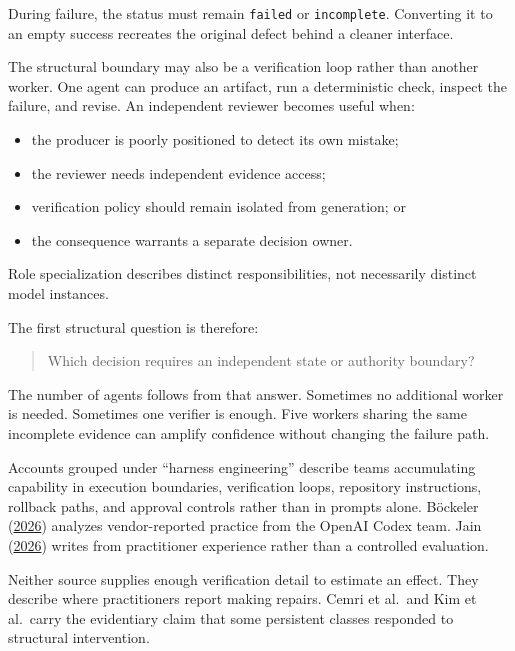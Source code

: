 During failure, the status must remain \texttt{failed} or \texttt{incomplete}. Converting it to an empty success recreates the original defect behind a cleaner interface.


The structural boundary may also be a verification loop rather than another worker. One agent can produce an artifact, run a deterministic check, inspect the failure, and revise. An independent reviewer becomes useful when:

\begin{itemize}
\tightlist
\item
  the producer is poorly positioned to detect its own mistake;
\item
  the reviewer needs independent evidence access;
\item
  verification policy should remain isolated from generation; or
\item
  the consequence warrants a separate decision owner.
\end{itemize}

Role specialization describes distinct responsibilities, not necessarily distinct model instances.

The first structural question is therefore:

\begin{quote}
Which decision requires an independent state or authority boundary?
\end{quote}

The number of agents follows from that answer. Sometimes no additional worker is needed. Sometimes one verifier is enough. Five workers sharing the same incomplete evidence can amplify confidence without changing the failure path.

Accounts grouped under ``harness engineering'' describe teams accumulating capability in execution boundaries, verification loops, repository instructions, rollback paths, and approval controls rather than in prompts alone. Böckeler (\href{https://martinfowler.com/articles/exploring-gen-ai/harness-engineering.html}{2026}) analyzes vendor-reported practice from the OpenAI Codex team. Jain (\href{https://www.reddit.com/r/devops/comments/1touxz4/}{2026}) writes from practitioner experience rather than a controlled evaluation.

Neither source supplies enough verification detail to estimate an effect. They describe where practitioners report making repairs. Cemri et al.~and Kim et al.~carry the evidentiary claim that some persistent classes responded to structural intervention.

